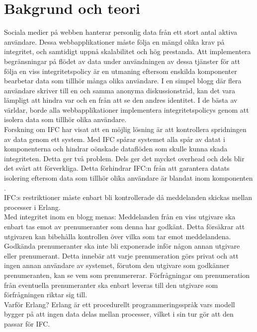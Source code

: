 \documentclass[12pt]{article}
\begin{document}
 \section{Bakgrund och teori}


Sociala medier på webben hanterar personlig data från ett stort antal aktiva användare. Dessa webbapplikationer måste följa en mängd olika krav på integritet, och samtidigt uppnå skalabilitet och hög prestanda. Att implementera begränsningar på flödet av data under användningen av dessa tjänster för att följa en viss integritetspolicy är en utmaning eftersom enskilda komponenter bearbetar data som tillhör många olika användare. I en simpel blogg där flera användare skriver till en och samma anonyma diskussionstråd, kan det vara lämpligt att hindra var och en från att se den andres identitet. I de bästa av världar, borde alla webbapplikationer implementera integritetspolicys genom att isolera data som tillhör olika användare. \cite{IFC}	
\\
Forskning om IFC har visat att en möjlig lösning är att kontrollera spridningen av data genom ett system. Med IFC spårar systemet alla spår av datat i komponenterna och hindrar oönskade dataflöden som skulle kunna skada integriteten. Detta ger två problem. Dels ger det mycket overhead och dels blir det svårt att förverkliga. Detta förhindrar IFC:n från att garantera datats isolering eftersom data som tillhör olika användare är blandat inom komponenten \cite{IFC}. 
\\
IFC:s restriktioner måste enbart bli kontrollerade då meddelanden skickas mellan processer i Erlang. \cite{IFC}
\\
Med integritet inom en blogg menas:
Meddelanden från en viss utgivare ska enbart tas emot av prenumeranter som denna har godkänt. Detta försäkrar att utgivaren kan bibehålla kontrollen över vilka som tar emot meddelandena.
Godkända prenumeranter ska inte bli exponerade inför någon annan utgivare eller prenumerant. Detta innebär att varje prenumeration görs privat och att ingen annan användare av systemet, förutom den utgivare som godkänner prenumeranten, kan se vem som prenumererar.
Förfrågningar om prenumeration från eventuella prenumeranter ska enbart leveras till den utgivare som förfrågningen riktar sig till. \cite{IFC}
\\
Varför Erlang? Erlang är ett procedurellt programmeringsspråk vars modell bygger på att ingen data delas mellan processer, vilket i sin tur gör att den passar för IFC. \cite{IFC}
\end{document}
